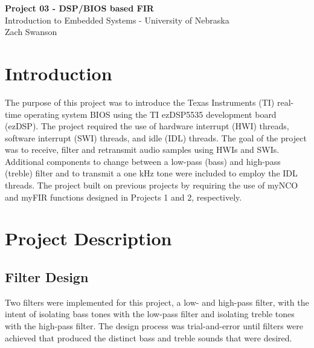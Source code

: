 \documentclass[11pt,pdftex,portrait,letterpaper]{article}
\begin{document}
\vspace*{30ex}
\begin{center}

\textbf{Project 03 - DSP/BIOS based FIR }\\

\vspace{4ex}
Introduction to Embedded Systems - University of Nebraska \\

\vspace{4ex}
Zach Swanson\\

\end{center}


\pagebreak
\tableofcontents
\pagebreak


\section{Introduction}

The purpose of this project was to introduce the Texas Instruments (TI) real-time operating system BIOS using the TI ezDSP5535 development board (ezDSP). The project required the use of hardware interrupt (HWI) threads, software interrupt (SWI) threads, and idle (IDL) threads. The goal of the project was to receive, filter and retransmit audio samples using HWIs and SWIs. Additional components to change between a low-pass (bass) and high-pass (treble) filter and to transmit a one kHz tone were included to employ the IDL threads. The project built on previous projects by requiring the use of myNCO and myFIR functions designed in Projects 1 and 2, respectively.
 
\section{Project Description}

\subsection{Filter Design}

Two filters were implemented for this project, a low- and high-pass filter, with the intent of isolating bass tones with the low-pass filter and isolating treble tones with the high-pass filter. The design process was trial-and-error until filters were achieved that produced the distinct bass and treble sounds that were desired. 
\end{document}
